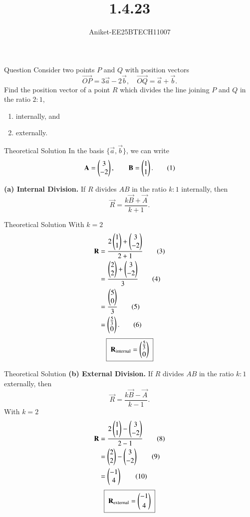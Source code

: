 \documentclass{beamer}
\title %
{1.4.23}
\author %
{Aniket-EE25BTECH11007}
\begin{document}
\frame{\titlepage}
\begin{frame}{Question}
Consider two points $P$ and $Q$ with position vectors 
\[
\vec{OP} = 3\vec{a} - 2\vec{b}, \quad \vec{OQ} = \vec{a} + \vec{b}.
\]
Find the position vector of a point $R$ which divides the line joining $P$ and $Q$ in the ratio $2:1$,
\begin{enumerate}
    \item internally, and 
    \item externally.
\end{enumerate}
\end{frame}

\begin{frame}{Theoretical Solution}
In the basis $\{\vec a,\vec b\}$, we can write
\[
\mathbf A=\begin{pmatrix}3\\-2\end{pmatrix},
\qquad
\mathbf B=\begin{pmatrix}1\\1\end{pmatrix}. \tag{1}
\]

\textbf{(a) Internal Division.} If $R$ divides $AB$ in the ratio $k:1$ internally, then
\[
\vec R=\frac{k\vec B+\vec A}{k+1}. \tag{2}
\]
\end{frame}
\begin{frame}{Theoretical Solution}
With $k=2$ 
\begin{align}
\mathbf R
&=\frac{2\begin{pmatrix}1\\1\end{pmatrix}+\begin{pmatrix}3\\-2\end{pmatrix}}{2+1} \tag{3}\\
&=\frac{\begin{pmatrix}2\\2\end{pmatrix}+\begin{pmatrix}3\\-2\end{pmatrix}}{3} \tag{4}\\
&=\frac{\begin{pmatrix}5\\0\end{pmatrix}}{3} \tag{5}\\
&=\begin{pmatrix}\tfrac{5}{3}\\0\end{pmatrix}. \tag{6}
\end{align}
\[
\boxed{\;\mathbf R_{\text{internal}}=\begin{pmatrix}\tfrac{5}{3}\\[2pt]0\end{pmatrix}\;}
\]

\bigskip
\end{frame}
\begin{frame}{Theoretical Solution}
\textbf{(b) External Division.} If $R$ divides $AB$ in the ratio $k:1$ externally, then
\[
\vec R=\frac{k\vec B-\vec A}{k-1}. \tag{7}
\]
With $k=2$
\begin{align}
\mathbf R
&=\frac{2\begin{pmatrix}1\\1\end{pmatrix}-\begin{pmatrix}3\\-2\end{pmatrix}}{2-1} \tag{8}\\
&=\begin{pmatrix}2\\2\end{pmatrix}-\begin{pmatrix}3\\-2\end{pmatrix} \tag{9}\\
&=\begin{pmatrix}-1\\4\end{pmatrix} \tag{10}
\end{align}
\[
\boxed{\;\mathbf R_{\text{external}}=\begin{pmatrix}-1\\[2pt]4\end{pmatrix}\;}
\]
\end{frame}
\end{document}

